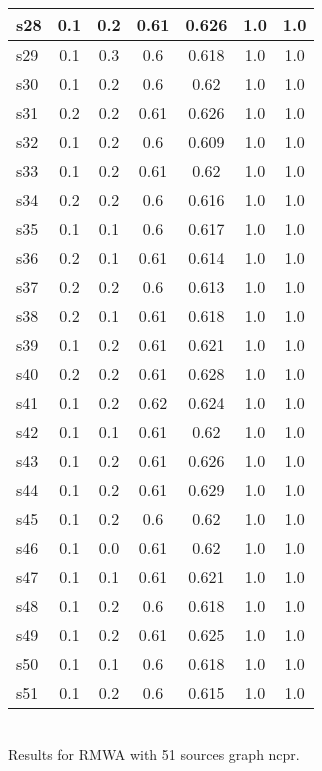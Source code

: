 \documentclass{article}
\begin{document}
\begin{tabular}{|l|c|c|c|c|c|c|}
\hline
s28 &0.1 & 0.2 & 0.61 & 0.626 & 1.0 & 1.0\\
\hline
s29 &0.1 & 0.3 & 0.6 & 0.618 & 1.0 & 1.0\\
\hline
s30 &0.1 & 0.2 & 0.6 & 0.62 & 1.0 & 1.0\\
\hline
s31 &0.2 & 0.2 & 0.61 & 0.626 & 1.0 & 1.0\\
\hline
s32 &0.1 & 0.2 & 0.6 & 0.609 & 1.0 & 1.0\\
\hline
s33 &0.1 & 0.2 & 0.61 & 0.62 & 1.0 & 1.0\\
\hline
s34 &0.2 & 0.2 & 0.6 & 0.616 & 1.0 & 1.0\\
\hline
s35 &0.1 & 0.1 & 0.6 & 0.617 & 1.0 & 1.0\\
\hline
s36 &0.2 & 0.1 & 0.61 & 0.614 & 1.0 & 1.0\\
\hline
s37 &0.2 & 0.2 & 0.6 & 0.613 & 1.0 & 1.0\\
\hline
s38 &0.2 & 0.1 & 0.61 & 0.618 & 1.0 & 1.0\\
\hline
s39 &0.1 & 0.2 & 0.61 & 0.621 & 1.0 & 1.0\\
\hline
s40 &0.2 & 0.2 & 0.61 & 0.628 & 1.0 & 1.0\\
\hline
s41 &0.1 & 0.2 & 0.62 & 0.624 & 1.0 & 1.0\\
\hline
s42 &0.1 & 0.1 & 0.61 & 0.62 & 1.0 & 1.0\\
\hline
s43 &0.1 & 0.2 & 0.61 & 0.626 & 1.0 & 1.0\\
\hline
s44 &0.1 & 0.2 & 0.61 & 0.629 & 1.0 & 1.0\\
\hline
s45 &0.1 & 0.2 & 0.6 & 0.62 & 1.0 & 1.0\\
\hline
s46 &0.1 & 0.0 & 0.61 & 0.62 & 1.0 & 1.0\\
\hline
s47 &0.1 & 0.1 & 0.61 & 0.621 & 1.0 & 1.0\\
\hline
s48 &0.1 & 0.2 & 0.6 & 0.618 & 1.0 & 1.0\\
\hline
s49 &0.1 & 0.2 & 0.61 & 0.625 & 1.0 & 1.0\\
\hline
s50 &0.1 & 0.1 & 0.6 & 0.618 & 1.0 & 1.0\\
\hline
s51 &0.1 & 0.2 & 0.6 & 0.615 & 1.0 & 1.0\\
\hline
\end{tabular}\\

\noindent Results for RMWA with 51 sources graph ncpr.
\end{document}

